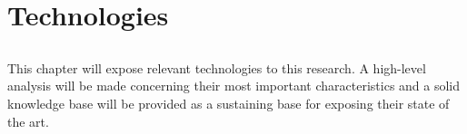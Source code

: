 \chapter{Technologies} %
\label{cha:technologies}

\section*{} %
This chapter will expose relevant technologies to this research. A high-level analysis will be made concerning their most important characteristics and a solid knowledge base will be provided as a sustaining base for exposing their state of the art.






